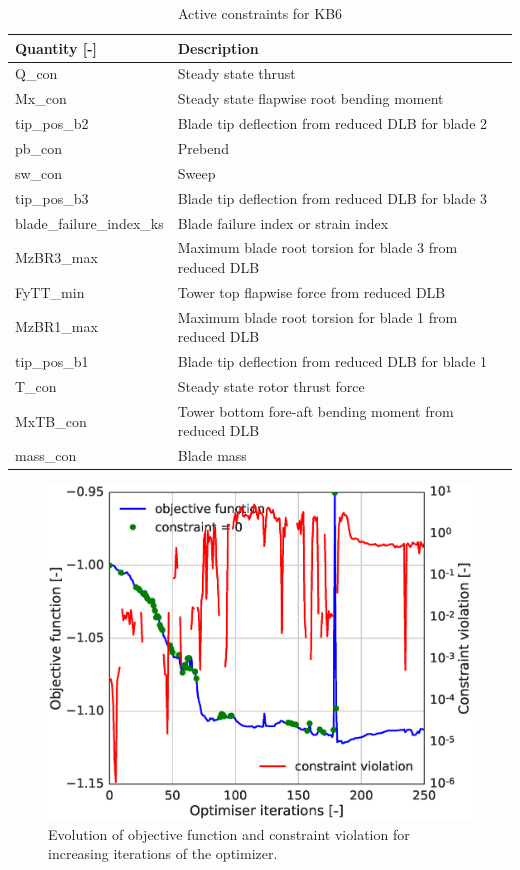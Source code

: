 \begin{table}[!ht]
\centering
\caption{Active constraints for KB6}
\label{tab:KB6_cons}
\begin{tabular}{|l|l|}
\hline
 Quantity [-]             & Description           \\
\hline
Q\_con                    &  Steady state thrust  \\
Mx\_con                   &  Steady state flapwise root bending moment    \\
tip\_pos\_b2              &  Blade tip deflection from reduced DLB for blade 2 \\
pb\_con                   &  Prebend    \\
sw\_con                   &  Sweep                  \\
tip\_pos\_b3              &  Blade tip deflection from reduced DLB for blade 3             \\
blade\_failure\_index\_ks &  Blade failure index or strain index  \\
MzBR3\_max                &  Maximum blade root torsion for blade 3 from reduced DLB \\
FyTT\_min                 &  Tower top flapwise force from reduced DLB\\
MzBR1\_max                &  Maximum blade root torsion for blade 1 from reduced DLB \\
tip\_pos\_b1              &  Blade tip deflection from reduced DLB for blade 1 \\
T\_con                    &  Steady state rotor thrust force \\
MxTB\_con                 &  Tower bottom fore-aft bending moment from reduced DLB\\
mass\_con                  &  Blade mass      \\
\hline
\end{tabular}
\end{table}

\begin{figure}[pht]
\begin{center}
	\includegraphics[width=.85\linewidth]{figures/KB6_final/KB6_obj_cons_ipopt.eps}
\end{center}
\caption{Evolution of objective function and constraint violation for increasing iterations of the optimizer.}
\label{fig:KB6_objf}
\end{figure}

